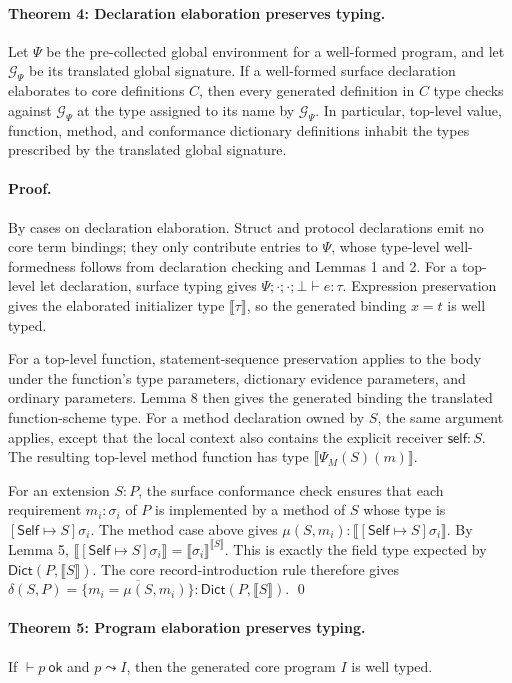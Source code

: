 \documentclass[manuscript,nonacm]{acmart}
\newcommand{\kw}[1]{\ensuremath{\mathsf{#1}}}
\newcommand{\Self}{\kw{Self}\xspace}
\newcommand{\ok}{\ \kw{ok}}
\newcommand{\emptyctx}{\cdot}
\newcommand{\has}{\vdash}
\newcommand{\elab}{\leadsto}
\newcommand{\trans}[1]{\llbracket #1 \rrbracket}
\newcommand{\transSelf}[2]{\llbracket #2 \rrbracket^{#1}}
\newcommand{\Dict}{\mathsf{Dict}}
\begin{document}
\paragraph{Theorem 4: Declaration elaboration preserves typing.}
Let $\Psi$ be the pre-collected global environment for a well-formed program, and let $\mathcal{G}_\Psi$ be its translated global signature.
If a well-formed surface declaration elaborates to core definitions $C$, then every generated definition in $C$ type checks against $\mathcal{G}_\Psi$ at the type assigned to its name by $\mathcal{G}_\Psi$.
In particular, top-level value, function, method, and conformance dictionary definitions inhabit the types prescribed by the translated global signature.

\paragraph{Proof.}
By cases on declaration elaboration.
Struct and protocol declarations emit no core term bindings; they only contribute entries to $\Psi$, whose type-level well-formedness follows from declaration checking and Lemmas 1 and 2.
For a top-level let declaration, surface typing gives $\Psi;\emptyctx;\emptyctx;\bot\has e:\tau$.
Expression preservation gives the elaborated initializer type $\trans{\tau}$, so the generated binding $x=t$ is well typed.

For a top-level function, statement-sequence preservation applies to the body under the function's type parameters, dictionary evidence parameters, and ordinary parameters.
Lemma 8 then gives the generated binding the translated function-scheme type.
For a method declaration owned by $S$, the same argument applies, except that the local context also contains the explicit receiver $\kw{self}:S$.
The resulting top-level method function has type $\trans{\Psi_M(S)(m)}$.

For an extension $S:P$, the surface conformance check ensures that each requirement
$m_i:\sigma_i$ of $P$ is implemented by a method of $S$ whose type is
$[\Self\mapsto S]\sigma_i$.
The method case above gives
$\mu(S,m_i):\trans{[\Self\mapsto S]\sigma_i}$.
By Lemma 5,
$\trans{[\Self\mapsto S]\sigma_i}=\transSelf{\trans{S}}{\sigma_i}$.
This is exactly the field type expected by $\Dict(P,\trans{S})$.
The core record-introduction rule therefore gives
$\delta(S,P)=\{\overline{m_i=\mu(S,m_i)}\}:\Dict(P,\trans{S})$.
\qed

\paragraph{Theorem 5: Program elaboration preserves typing.}
If $\has p\ok$ and $p\elab I$, then the generated core program $I$ is well typed.
\end{document}
